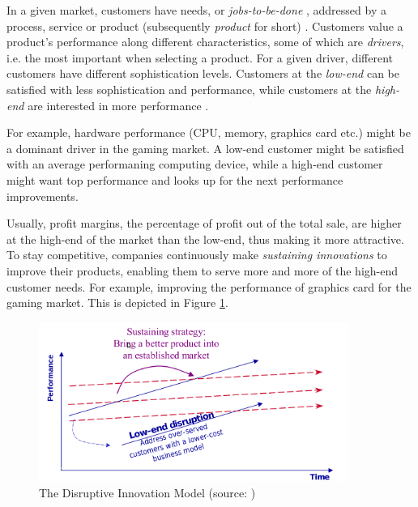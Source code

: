 \documentclass[a4paper,10pt]{article}
\begin{document}
In a given market, customers have needs, or \emph{jobs-to-be-done} \cite{DisruptingClassExpandedEdition},
addressed by a process, service or product (subsequently \emph{product} for short) \cite{scientificArticlePredictingTheUnpredictable}.
Customers value a product's performance along different characteristics, some of which are \emph{drivers}, i.e. 
the most important when selecting a product. For a given driver, different customers have different sophistication levels. 
Customers at the \emph{low-end} can be satisfied with 
less sophistication and performance, while customers at the \emph{high-end} are interested in more performance \cite{innovatorsSolution}. 

For example, hardware performance (CPU, memory, graphics card etc.) might be a dominant driver in the gaming market. 
A low-end customer might be satisfied with an average performaning computing device, 
while a high-end customer might want top performance and looks up for the next performance improvements.

Usually, profit margins, the percentage of profit out of the total sale, are higher at the high-end of the market than the low-end, thus 
making it more attractive.
To stay competitive, companies continuously make \emph{sustaining innovations} to improve their products, enabling them to serve more and more of 
the high-end customer needs. For example, improving the performance of graphics card for the gaming market. This is depicted in Figure \ref{fig:disruptiveInnovationModel}.\\

\begin{figure}[here]
\includegraphics[width=0.9\textwidth]{images/simpleDisruptiveInnovationModel.png}
 \caption{The Disruptive Innovation Model (source: \cite{innovatorsSolution})}
\label{fig:disruptiveInnovationModel}
\end{figure}
\end{document}
